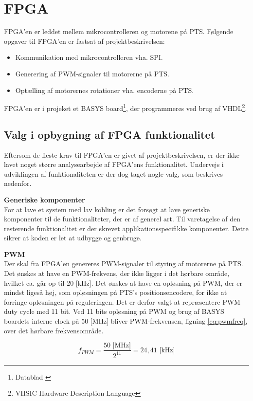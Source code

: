 \section{FPGA}
\label{sec:FPGA}
FPGA'en er leddet mellem mikrocontrolleren og motorene på PTS.
Følgende opgaver til FPGA'en er fastsat af projektbeskrivelsen:

\begin{itemize}
\itemsep1pt
	\item Kommunikation med mikrocontrolleren vha. SPI.
	\item Generering af PWM-signaler til motorerne på PTS.
	\item Optælling af motorernes rotationer vha. encoderne på PTS.
\end{itemize}
FPGA'en er i projeket et BASYS board\footnote{Datablad \citep{basys2}}, der programmeres ved brug af VHDL\footnote{VHSIC Hardware Description Language}.

\subsection{Valg i opbygning af FPGA funktionalitet}
Eftersom de fleste krav til FPGA'en er givet af projektbeskrivelsen, er der ikke 
lavet noget større analysearbejde af FPGA'ens funktionalitet. Undervejs i 
udviklingen af funktionaliteten er der dog taget nogle valg, som beskrives nedenfor.

\textbf{Generiske komponenter}\\
For at lave et system med lav kobling er det forsøgt at lave 
generiske komponenter til de funktionaliteter, der er af generel art. 
Til varetagelse af den resterende funktionalitet er der skrevet applikationsspecifikke 
komponenter.
Dette sikrer at koden er let at udbygge og genbruge.

\textbf{PWM}\\
Der skal fra FPGA'en genereres PWM-signaler til styring af motorerne på PTS.
Det ønskes at have en PWM-frekvens, der ikke ligger i det hørbare område, hvilket ca. går op til 20 [kHz]\citep{Hearingrange}. 
Det ønskes at have en opløsning på PWM, der er mindst ligeså høj, som 
opløsningen på PTS's positionsencodere, for ikke at forringe opløsningen på reguleringen. 
Det er derfor valgt at repræsentere PWM duty cycle med 11 bit. 
Ved 11 bits opløsning på PWM og brug af BASYS boardets interne clock på 50 [MHz] bliver PWM-frekvensen,
ligning \ref{eq:pwmfreq}, over det hørbare frekvensområde.

\begin{equation}
  f_{PWM}=\frac{50 \text{ [MHz]}}{2^{11}} = 24,41 \text{ [kHz]}
	\label{eq:pwmfreq}
\end{equation}

